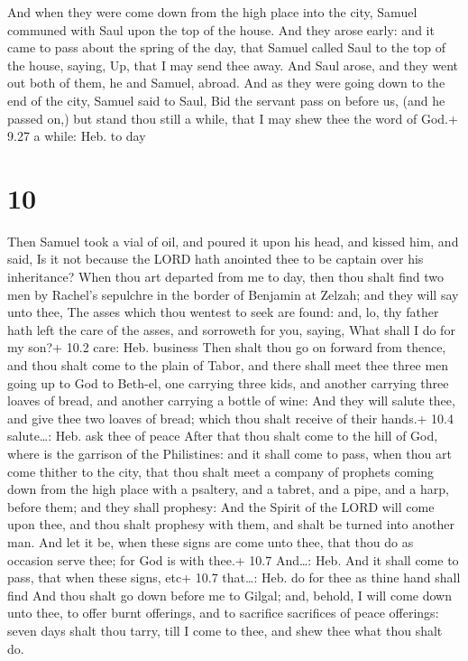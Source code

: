  And when they were come down from the high place into
the city, Samuel communed with Saul upon the top of the house.
 And they arose early: and it came to pass about the spring
of the day, that Samuel called Saul to the top of the house, saying, Up,
that I may send thee away. And Saul arose, and they went out both of
them, he and Samuel, abroad.  And as they were going down
to the end of the city, Samuel said to Saul, Bid the servant pass on
before us, (and he passed on,) but stand thou still a while, that I may
shew thee the word of God.+ 9.27 a while: Heb. to day

\hypertarget{section-9}{%
\section{10}\label{section-9}}

 Then Samuel took a vial of oil, and poured it upon his
head, and kissed him, and said, Is it not because the LORD hath anointed
thee to be captain over his inheritance?  When thou art
departed from me to day, then thou shalt find two men by Rachel's
sepulchre in the border of Benjamin at Zelzah; and they will say unto
thee, The asses which thou wentest to seek are found: and, lo, thy
father hath left the care of the asses, and sorroweth for you, saying,
What shall I do for my son?+ 10.2 care: Heb. business  Then
shalt thou go on forward from thence, and thou shalt come to the plain
of Tabor, and there shall meet thee three men going up to God to
Beth-el, one carrying three kids, and another carrying three loaves of
bread, and another carrying a bottle of wine:  And they will
salute thee, and give thee two loaves of bread; which thou shalt receive
of their hands.+ 10.4 salute\ldots: Heb. ask thee of peace 
After that thou shalt come to the hill of God, where is the garrison of
the Philistines: and it shall come to pass, when thou art come thither
to the city, that thou shalt meet a company of prophets coming down from
the high place with a psaltery, and a tabret, and a pipe, and a harp,
before them; and they shall prophesy:  And the Spirit of the
LORD will come upon thee, and thou shalt prophesy with them, and shalt
be turned into another man.  And let it be, when these signs
are come unto thee, that thou do as occasion serve thee; for God is with
thee.+ 10.7 And\ldots: Heb. And it shall come to pass, that when these
signs, etc+ 10.7 that\ldots: Heb. do for thee as thine hand shall find
 And thou shalt go down before me to Gilgal; and, behold, I
will come down unto thee, to offer burnt offerings, and to sacrifice
sacrifices of peace offerings: seven days shalt thou tarry, till I come
to thee, and shew thee what thou shalt do.


